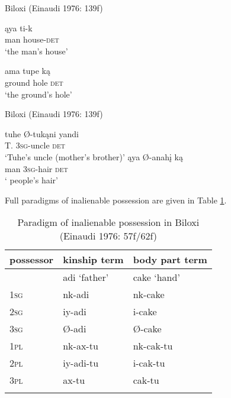 \documentclass[output=paper]{LSP/langsci}
\begin{document}
\ea Biloxi (Einaudi 1976: 139f) \label{biloxihouse}

\ea
\gll \k{a}ya   ti-k		\\				
man house-\textsc{det} \\
\glt `the man's house'

\ex 
\gll ama tupe k\k{a} \\
ground hole \textsc{det} \\
\glt `the ground's hole'
\z \z

\ea	Biloxi (Einaudi 1976: 139f) \label{biloxiuncle}

\ea \gll tuhe   Ø-tukąni       yandi	\\  
T.      \textsc{3sg}-uncle    \textsc{det} \\
\glt `Tuhe's uncle (mother's brother)'
\ex \gll ąya   Ø-anahį    k\k{a} \\
man \textsc{3sg}-hair   \textsc{det} \\
\glt `	people's hair'
\z \z

Full paradigms of inalienable possession are given in Table \ref{biloxiparadigm}.

\begin{table}
\caption{Paradigm of inalienable possession in Biloxi (Einaudi 1976: 57f/62f)} \label{biloxiparadigm}
\begin{tabular}[h!]{l l l }
\lsptoprule
possessor	& kinship term & body part term \\
\midrule
& adi `father' & cake `hand' \\
 
\textsc{1sg} & nk-adi	& nk-cake \\
 
\textsc{2sg} & iy-adi & i-cake \\
 
\textsc{3sg} & Ø-adi & Ø-cake \\
 
\textsc{1pl} & nk-ax-tu & nk-cak-tu \\
 
\textsc{2pl} & iy-adi-tu & i-cak-tu \\
 
\textsc{3pl} & ax-tu & cak-tu \\
\lspbottomrule
\end{tabular}
\end{table}
\end{document}
